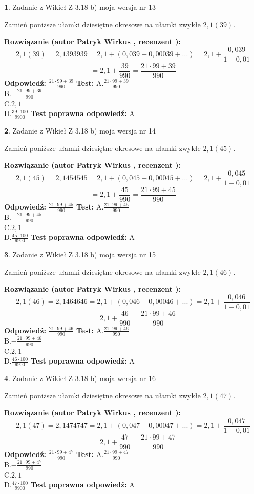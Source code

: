 \documentclass[12pt, a4paper]{article}
\theoremstyle{definition} %
\newtheorem{zad}{}
\newcommand{\zadStart}[1]{\begin{zad}#1\newline}
\newcommand{\zadStop}{\end{zad}}
\newcommand{\rozwStart}[2]{\noindent \textbf{Rozwiązanie (autor #1 , recenzent #2): }\newline}
\newcommand{\rozwStop}{\newline}
\newcommand{\odpStart}{\noindent \textbf{Odpowiedź:}\newline}
\newcommand{\odpStop}{\newline}
\newcommand{\testStart}{\noindent \textbf{Test:}\newline}
\newcommand{\testStop}{\newline}
\newcommand{\kluczStart}{\noindent \textbf{Test poprawna odpowiedź:}\newline}
\newcommand{\kluczStop}{\newline}
\begin{document}
\zadStart{Zadanie z Wikieł Z 3.18 b) moja wersja nr 13}

Zamień poniższe ułamki dziesiętne okresowe na ułamki zwykłe $2,1(39)$.
\zadStop
\rozwStart{Patryk Wirkus}{}
$$2,1(39)=2,1393939=2,1+(0,039+0,00039+...)=2,1+\frac{0,039}{1-0,01}$$
$$=2,1+\frac{39}{990}=\frac{21\cdot99+39}{990}$$
\rozwStop
\odpStart
$\frac{21\cdot99+39}{990}$
\odpStop
\testStart
A.$\frac{21\cdot99+39}{990}$\\ B.$-\frac{21\cdot99+39}{990}$\\ C.$2,1$\\ D.$\frac{39\cdot100}{9900}$
\testStop
\kluczStart
A
\kluczStop



\zadStart{Zadanie z Wikieł Z 3.18 b) moja wersja nr 14}

Zamień poniższe ułamki dziesiętne okresowe na ułamki zwykłe $2,1(45)$.
\zadStop
\rozwStart{Patryk Wirkus}{}
$$2,1(45)=2,1454545=2,1+(0,045+0,00045+...)=2,1+\frac{0,045}{1-0,01}$$
$$=2,1+\frac{45}{990}=\frac{21\cdot99+45}{990}$$
\rozwStop
\odpStart
$\frac{21\cdot99+45}{990}$
\odpStop
\testStart
A.$\frac{21\cdot99+45}{990}$\\ B.$-\frac{21\cdot99+45}{990}$\\ C.$2,1$\\ D.$\frac{45\cdot100}{9900}$
\testStop
\kluczStart
A
\kluczStop



\zadStart{Zadanie z Wikieł Z 3.18 b) moja wersja nr 15}

Zamień poniższe ułamki dziesiętne okresowe na ułamki zwykłe $2,1(46)$.
\zadStop
\rozwStart{Patryk Wirkus}{}
$$2,1(46)=2,1464646=2,1+(0,046+0,00046+...)=2,1+\frac{0,046}{1-0,01}$$
$$=2,1+\frac{46}{990}=\frac{21\cdot99+46}{990}$$
\rozwStop
\odpStart
$\frac{21\cdot99+46}{990}$
\odpStop
\testStart
A.$\frac{21\cdot99+46}{990}$\\ B.$-\frac{21\cdot99+46}{990}$\\ C.$2,1$\\ D.$\frac{46\cdot100}{9900}$
\testStop
\kluczStart
A
\kluczStop



\zadStart{Zadanie z Wikieł Z 3.18 b) moja wersja nr 16}

Zamień poniższe ułamki dziesiętne okresowe na ułamki zwykłe $2,1(47)$.
\zadStop
\rozwStart{Patryk Wirkus}{}
$$2,1(47)=2,1474747=2,1+(0,047+0,00047+...)=2,1+\frac{0,047}{1-0,01}$$
$$=2,1+\frac{47}{990}=\frac{21\cdot99+47}{990}$$
\rozwStop
\odpStart
$\frac{21\cdot99+47}{990}$
\odpStop
\testStart
A.$\frac{21\cdot99+47}{990}$\\ B.$-\frac{21\cdot99+47}{990}$\\ C.$2,1$\\ D.$\frac{47\cdot100}{9900}$
\testStop
\kluczStart
A
\kluczStop
\end{document}
